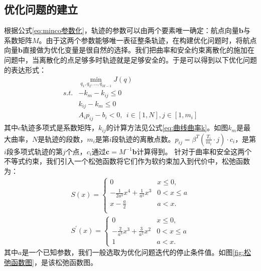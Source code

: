 \documentclass[master,academic]{ysuthesis} %
\begin{document}
		\subsection{优化问题的建立}
		根据公式\ref{eq:minco参数化}，轨迹的参数可以由两个要素唯一确定：航点向量$\mathbf{b}$与系数矩阵$M$。由于这两个参数能够唯一表征整条轨迹，在构建优化问题时，将航点向量$\mathbf{b}$直接做为优化变量是很自然的选择。我们把曲率和安全约束离散化的施加在问题中，当离散化的点足够多时轨迹就是足够安全的。于是可以得到以下优化问题的表达形式：
		\begin{equation}
			\begin{aligned}
				&\min_{q_1,q_2,...,q_{M-1}} J( q ) \\
				s.t.&-k_{m}-k_{ij}\le 0\\
				&k_{ij}-k_{m}\le 0 \\
				&A_ip_{ij}-b_i<0,\ \ i\in \left[ 1,N \right] ,j\in \left[ 1,m_i \right] 
			\end{aligned}
		\end{equation}
		其中$c$轨迹多项式是系数矩阵，$k_{ij}$的计算方法见公式\ref{eq:曲线曲率k}。如图$k_{m}$是最大曲率，$N$是轨迹的段数，$m_i$是第$i$段轨迹的离散点数。$p_{ij}=\beta^T(\frac{T_i}{m_i}\cdot j)\cdot c_i$，是第$i$段多项式轨迹的第$j$个点，$c_i$通过$\mathbf{c} = M^{-1}\mathbf{b}$计算得到。
		针对于曲率和安全这两个不等式约束，我们引入一个松弛函数将它们作为软约束加入到代价中，松弛函数为：
		\begin{equation}
			\begin{aligned}
				S( x ) =\left\{ \begin{matrix}
					0&		x\le 0,\\
					-\frac{1}{2a^3}x^4+\frac{1}{a^2}x^3&		0<x\le a\\
					x-\frac{a}{2}&		a<x.\\
				\end{matrix} \right.  \\
					S^{'}(x) = \left\{\begin{matrix}
					0& x\le0, \\
					-\frac{2}{a^3}x^3+\frac{3}{a^2}x^2& 0 < x \le a \\
					1& a < x.
				\end{matrix}\right.
			\end{aligned}
			\label{eq:松弛函数}
		\end{equation}
		其中$a$是一个已知参数，我们一般选取为优化问题迭代的停止条件值。如图\ref{fig:松弛函数图}，是该松弛函数图。
\end{document}
